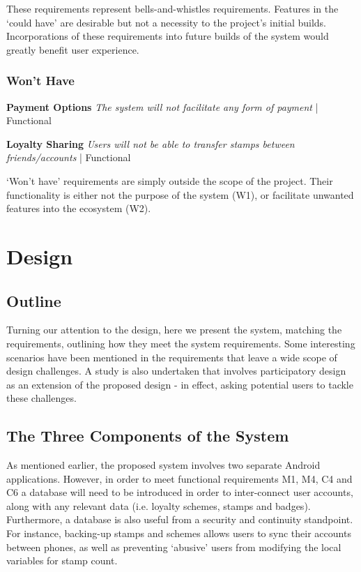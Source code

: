 These requirements represent bells-and-whistles requirements. Features in the `could have' are desirable but not a necessity to the project's initial builds. Incorporations of these requirements into future builds of the system would greatly benefit user experience.

\subsubsection{Won't Have}
\begin{description}[leftmargin=!,labelwidth=\widthof{\bfseries Medium}]
    \item[W1] \textbf{Payment Options} \newline
        \textit{The system will not facilitate any form of payment}  | Functional  
        
    \item[W2] \textbf{Loyalty Sharing} \newline
        \textit{Users will not be able to transfer stamps between friends/accounts}  | Functional 
\end{description}

`Won't have' requirements are simply outside the scope of the project. Their functionality is either not the purpose of the system (W1), or facilitate unwanted features into the ecosystem (W2). 






\clearpage{}
\section{Design}
\subsection{Outline}
Turning our attention to the design, here we present the system, matching the requirements, outlining how they meet the system requirements. Some interesting scenarios have been mentioned in the requirements that leave a wide scope of design challenges. A study is also undertaken that involves participatory design as an extension of the proposed design - in effect, asking potential users to tackle these challenges.


\subsection{The Three Components of the System}
As mentioned earlier, the proposed system involves two separate Android applications. However, in order to meet functional requirements M1, M4, C4 and C6 a database will need to be introduced in order to inter-connect user accounts, along with any relevant data (i.e. loyalty schemes, stamps and badges). Furthermore, a database is also useful from a security and continuity standpoint. For instance, backing-up stamps and schemes allows users to sync their accounts between phones, as well as preventing `abusive' users from modifying the local variables for stamp count.

